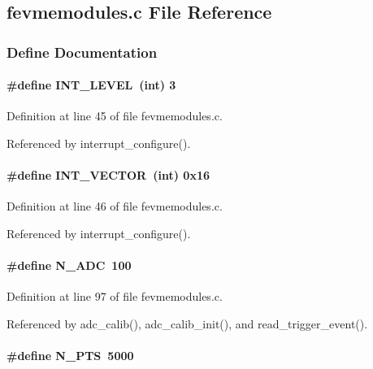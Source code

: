 \subsection{fevmemodules.c File Reference}
\label{fevmemodules_8c}


\subsubsection{Define Documentation}
\paragraph[{INT\_\-LEVEL}]{\setlength{\rightskip}{0pt plus 5cm}\#define INT\_\-LEVEL~(int) 3}\hfill\label{fevmemodules_8c_aed01298d37e73ed9737c8a6b70e67caa}


Definition at line 45 of file fevmemodules.c.

Referenced by interrupt\_\-configure().
\paragraph[{INT\_\-VECTOR}]{\setlength{\rightskip}{0pt plus 5cm}\#define INT\_\-VECTOR~(int) 0x16}\hfill\label{fevmemodules_8c_aa992c6e0d30eebad60b642ec25681bcb}


Definition at line 46 of file fevmemodules.c.

Referenced by interrupt\_\-configure().
\paragraph[{N\_\-ADC}]{\setlength{\rightskip}{0pt plus 5cm}\#define N\_\-ADC~100}\hfill\label{fevmemodules_8c_aeac9187aeffc031aa4adaf856d17093b}


Definition at line 97 of file fevmemodules.c.

Referenced by adc\_\-calib(), adc\_\-calib\_\-init(), and read\_\-trigger\_\-event().
\paragraph[{N\_\-PTS}]{\setlength{\rightskip}{0pt plus 5cm}\#define N\_\-PTS~5000}\hfill\label{fevmemodules_8c_a67f9565ee144db95e5394b15e393e539}


